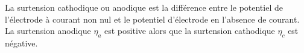 ﻿\documentclass[a4paper]{article}
\begin{document}
\pagestyle{fancy}
\fancyhf{}
\setlength{\headheight}{15pt}

\begin{center}
	\large{}
\end{center}


La surtension cathodique ou anodique est la différence entre le potentiel de l'électrode à courant non nul et le potentiel d'électrode en l'absence de courant.\\
La surtension anodique \(\eta_a\) est positive alors que la surtension cathodique \(\eta_c\) est négative.
\end{document}
